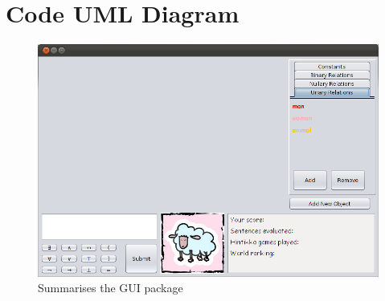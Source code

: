 \documentclass{report}
\begin{document}

\appendix
\chapter{Code UML Diagram}
\begin{figure}[h!]
\centering \includegraphics[scale=0.7]{gui.png}
\caption{Summarises the GUI package}
\end{figure}
\newpage
\end{document}
